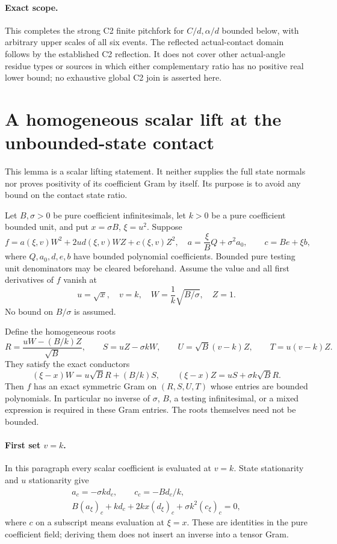 \paragraph{Exact scope.}
This completes the strong C2 finite pitchfork for $C/d,\alpha/d$
bounded below, with arbitrary upper scales of all six events.
The reflected actual-contact domain follows by the established C2
reflection. It does not cover other actual-angle residue types or
sources in which either complementary ratio has no positive real
lower bound; no exhaustive global C2 join is asserted here.


\section{\texorpdfstring{A homogeneous scalar lift at the unbounded-state contact}{A homogeneous scalar lift at the unbounded-state contact}}
\label{component:pbb29c73cc124}

\label{pbb29c73cc124:sec:unbounded-b-homogeneous-scalar}

This lemma is a scalar lifting statement.  It neither supplies the full
state normals nor proves positivity of its coefficient Gram by itself.
Its purpose is to avoid any bound on the contact state ratio.

Let $B,\sigma>0$ be pure coefficient infinitesimals, let $k>0$ be a
pure coefficient bounded unit, and put $x=\sigma B$, $\xi=u^2$.
Suppose
\[
 f=a(\xi,v)W^2+2u d(\xi,v)WZ+c(\xi,v)Z^2,
 \quad
 a=\frac\xi B Q+\sigma^2 a_0,\qquad
 c=B e+\xi b,                                      \tag{HL1}
\]
where $Q,a_0,d,e,b$ have bounded polynomial coefficients.  Bounded
pure testing unit denominators may be cleared beforehand.
Assume the value and all first derivatives of $f$ vanish at
\[
 u=\sqrt{x},\quad v=k,\quad
 W=\frac1k\sqrt{B/\sigma},\quad Z=1.                \tag{HL2}
\]
No bound on $B/\sigma$ is assumed.

Define the homogeneous roots
\[
 R=\frac{uW-(B/k)Z}{\sqrt B},\qquad
 S=uZ-\sigma kW,\qquad
 U=\sqrt B(v-k)Z,\qquad T=u(v-k)Z.                 \tag{HL3}
\]
They satisfy the exact conductors
\[
 (\xi-x)W=u\sqrt B R+(B/k)S,
 \qquad
 (\xi-x)Z=uS+\sigma k\sqrt B R.                    \tag{HL4}
\]
Then $f$ has an exact symmetric Gram on $(R,S,U,T)$ whose entries
are bounded polynomials.  In particular no inverse of $\sigma$,
$B$, a testing infinitesimal, or a mixed expression is required in
these Gram entries.  The roots themselves need not be bounded.

\paragraph{First set $v=k$.}
In this paragraph every scalar coefficient is evaluated at $v=k$.
State stationarity and $u$ stationarity give
\begin{gather*}
 a_c=-\sigma k d_c,\qquad c_c=-B d_c/k,\\
 B(a_\xi)_c+kd_c+2kx(d_\xi)_c
                      +\sigma k^2(c_\xi)_c=0,     \tag{HL5}
\end{gather*}
where $c$ on a subscript means evaluation at $\xi=x$.
These are identities in the pure coefficient field; deriving them
does not insert an inverse into a tensor Gram.

